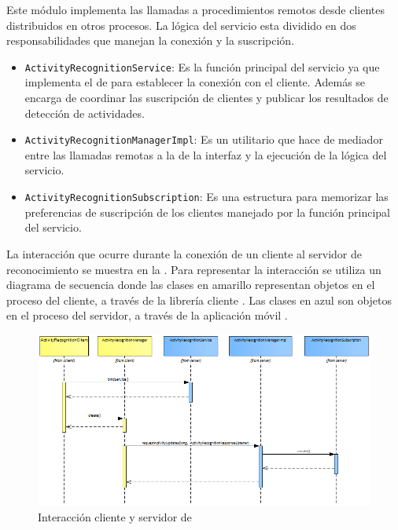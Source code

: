 Este módulo implementa las llamadas a procedimientos remotos desde
clientes distribuidos en otros procesos. La lógica del servicio esta
dividido en dos responsabilidades que manejan la conexión y la suscripción.
\begin{itemize}
\item \texttt{\small{}ActivityRecognitionService}: Es la función principal
del servicio ya que implementa el  de  para
establecer la conexión con el cliente. Además se encarga de coordinar
las suscripción de clientes y publicar los resultados de detección
de actividades. 
\item \texttt{\small{}ActivityRecognitionManagerImpl}: Es un utilitario
que hace de mediador entre las llamadas remotas a la  de
la interfaz y la ejecución de la lógica del servicio.
\item \texttt{\small{}ActivityRecognitionSubscription}: Es una estructura
para memorizar las preferencias de suscripción de los clientes manejado
por la función principal del servicio.
\end{itemize}
La interacción que ocurre durante la conexión de un cliente al servidor
de reconocimiento se muestra en la . Para
representar la interacción se utiliza un diagrama de secuencia 
donde las clases en amarillo representan objetos en el proceso del
cliente, a través de la librería cliente . Las clases
en azul son objetos en el proceso del servidor, a través de la aplicación
móvil .

\begin{figure}[H]
\begin{centering}
\includegraphics[width=1\columnwidth]{capitulo-5/graphics/service_subs}
\par\end{centering}
\caption[Interacción cliente y servidor de HARDroid]{\label{fig5:service-subs}Interacción cliente y servidor de }
\end{figure}

